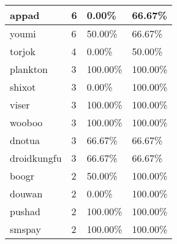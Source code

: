 \begin{table}[]
\begin{tabular}{|l|l|l|l|}
appad                                    & 6                                 & 0.00\%                                      & 66.67\%                                \\ \hline
youmi                                    & 6                                 & 50.00\%                                     & 66.67\%                                \\ \hline
torjok                                   & 4                                 & 0.00\%                                      & 50.00\%                                \\ \hline
plankton                                 & 3                                 & 100.00\%                                    & 100.00\%                               \\ \hline
shixot                                   & 3                                 & 0.00\%                                      & 100.00\%                               \\ \hline
viser                                    & 3                                 & 100.00\%                                    & 100.00\%                               \\ \hline
wooboo                                   & 3                                 & 100.00\%                                    & 100.00\%                               \\ \hline
dnotua                                   & 3                                 & 66.67\%                                     & 66.67\%                                \\ \hline
droidkungfu                              & 3                                 & 66.67\%                                     & 66.67\%                                \\ \hline
boogr                                    & 2                                 & 50.00\%                                     & 100.00\%                               \\ \hline
douwan                                   & 2                                 & 0.00\%                                      & 100.00\%                               \\ \hline
pushad                                   & 2                                 & 100.00\%                                    & 100.00\%                               \\ \hline
smspay                                   & 2                                 & 100.00\%                                    & 100.00\%                               \\ \hline

\end{tabular}
\end{table}
